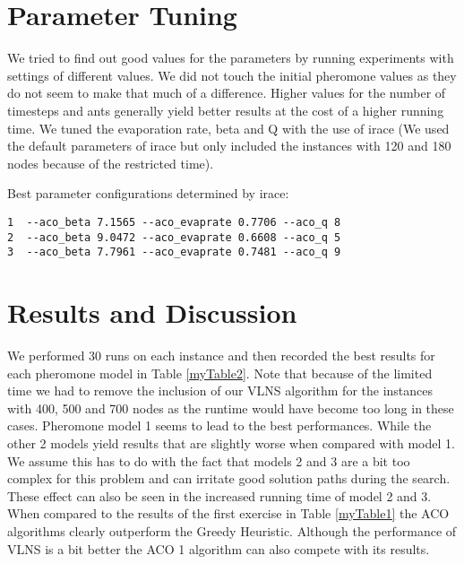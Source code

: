 \documentclass[a4paper]{scrartcl}
\begin{document}
\section{Parameter Tuning}
We tried to find out good values for the parameters by running experiments with settings of different values. We did not touch the initial pheromone values as they do not seem to make that much of a difference. Higher values for the number of timesteps and ants generally yield better results at the cost of a higher running time.
We tuned the evaporation rate, beta and Q with the use of irace \cite{lopez2011irace} (We used the default parameters of irace but only included the instances with 120 and 180 nodes because of the restricted time).

Best parameter configurations determined by irace:

\begin{verbatim}
1  --aco_beta 7.1565 --aco_evaprate 0.7706 --aco_q 8
2  --aco_beta 9.0472 --aco_evaprate 0.6608 --aco_q 5
3  --aco_beta 7.7961 --aco_evaprate 0.7481 --aco_q 9
\end{verbatim}

\section{Results and Discussion}

We performed 30 runs on each instance and then recorded the best results for each pheromone model in Table \ref{myTable2}. Note that because of the limited time we had to remove the inclusion of our VLNS algorithm for the instances with 400, 500 and 700 nodes as the runtime would have become too long in these cases.
Pheromone model 1 seems to lead to the best performances. While the other 2 models yield results that are slightly worse when compared with model 1. We assume this has to do with the fact that models 2 and 3 are a bit too complex for this problem and can irritate good solution paths during the search. These effect can also be seen in the increased running time of model 2 and 3.
When compared to the results of the first exercise in Table \ref{myTable1} the ACO algorithms clearly outperform the Greedy Heuristic. Although the performance of VLNS is a bit better the ACO 1 algorithm can also compete with its results.
\end{document}

